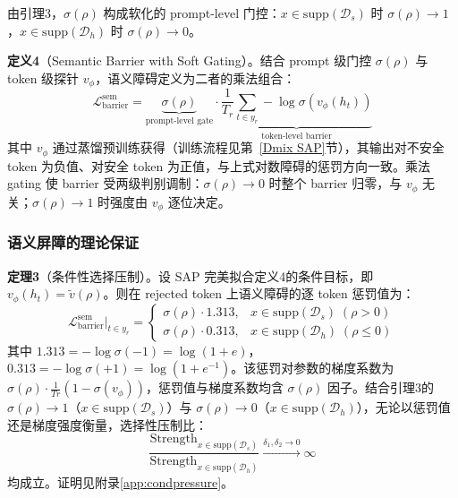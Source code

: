 \documentclass[lettersize,journal]{IEEEtran}
\begin{document}
由引理3，$\sigma(\rho)$ 构成软化的 prompt-level 门控：$x \in \mathrm{supp}(\mathcal{D}_s)$ 时 $\sigma(\rho) \to 1$，$x \in \mathrm{supp}(\mathcal{D}_h)$ 时 $\sigma(\rho) \to 0$。

\textbf{定义4}（Semantic Barrier with Soft Gating）。结合 prompt 级门控 $\sigma(\rho)$ 与 token 级探针 $v_\phi$，语义障碍定义为二者的乘法组合：
\begin{equation}\label{eq:semantic-barrier}
\mathcal{L}^{\text{sem}}_{\text{barrier}} = \underbrace{\sigma(\rho)}_{\text{prompt-level gate}} \cdot \underbrace{\frac{1}{T_r}\sum_{t \in y_r} -\log\sigma\!\left(v_\phi(h_t)\right)}_{\text{token-level barrier}}
\end{equation}
其中 $v_\phi$ 通过蒸馏预训练获得（训练流程见第~\ref{Dmix SAP}节），其输出对不安全 token 为负值、对安全 token 为正值，与上式对数障碍的惩罚方向一致。乘法 gating 使 barrier 受两级判别调制：$\sigma(\rho) \to 0$ 时整个 barrier 归零，与 $v_\phi$ 无关；$\sigma(\rho) \to 1$ 时强度由 $v_\phi$ 逐位决定。

\subsubsection{语义屏障的理论保证}\label{sec:barrier-theory}
\textbf{定理3}（条件性选择压制）。设 SAP 完美拟合定义4的条件目标，即 $v_\phi(h_t) = \tilde{v}(\rho)$。则在 rejected token 上语义障碍的逐 token 惩罚值为：
\begin{equation}\label{eq:cond-pressure}
\mathcal{L}^{\text{sem}}_{\text{barrier}}\bigg|_{t \in y_r} = \begin{cases}
\sigma(\rho) \cdot 1.313, & x \in \mathrm{supp}(\mathcal{D}_s)\;(\rho > 0)\\
\sigma(\rho) \cdot 0.313, & x \in \mathrm{supp}(\mathcal{D}_h)\;(\rho \leq 0)
\end{cases}
\end{equation}
其中 $1.313 = -\log\sigma(-1) = \log(1+e)$，$0.313 = -\log\sigma(+1) = \log(1+e^{-1})$。该惩罚对参数的梯度系数为 $\sigma(\rho)\cdot \frac{1}{Tr} (1-\sigma(v_\phi))$，惩罚值与梯度系数均含 $\sigma(\rho)$ 因子。结合引理3的 $\sigma(\rho) \to 1$（$x \in \mathrm{supp}(\mathcal{D}_s)$）与 $\sigma(\rho) \to 0$（$x \in \mathrm{supp}(\mathcal{D}_h)$），无论以惩罚值还是梯度强度衡量，选择性压制比：
\begin{equation}\label{eq:select-ratio}
\frac{\text{Strength}_{x \in \mathrm{supp}(\mathcal{D}_s)}}{\text{Strength}_{x \in \mathrm{supp}(\mathcal{D}_h)}} \xrightarrow[]{\delta_1, \delta_2 \to 0} \infty
\end{equation}
均成立。证明见附录\ref{app:condpressure}。
\end{document}
